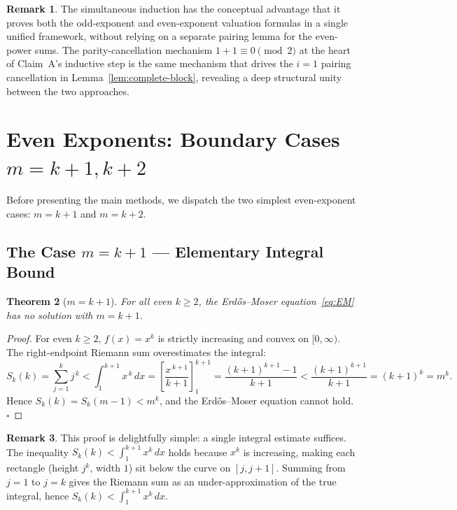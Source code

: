 \documentclass[12pt,a4paper]{article}
\theoremstyle{plain}
\newtheorem{theorem}{Theorem}[section]
\theoremstyle{definition}
\newtheorem{remark}[theorem]{Remark}
\begin{document}
\begin{remark}
  The simultaneous induction has the conceptual advantage that it proves
  both the odd-exponent and even-exponent valuation formulas in a single
  unified framework, without relying on a separate pairing lemma for the
  even-power sums.  The parity-cancellation mechanism
  $1 + 1 \equiv 0 \pmod{2}$ at the heart of Claim~A's inductive step is
  the same mechanism that drives the $i=1$ pairing cancellation in
  Lemma~\ref{lem:complete-block}, revealing a deep structural unity
  between the two approaches.
\end{remark}

\section{Even Exponents: Boundary Cases $m = k+1, k+2$}
\label{sec:boundary}

Before presenting the main methods, we dispatch the two simplest
even-exponent cases: $m = k+1$ and $m = k+2$.

\subsection{The Case $m = k+1$ --- Elementary Integral Bound}
\label{sec:even-k1}

\begin{theorem}[$m = k+1$]\label{thm:even-k1}
  For all even $k \ge 2$, the Erd\H{o}s--Moser equation~\eqref{eq:EM} has no
  solution with $m = k+1$.
\end{theorem}

\begin{proof}
  For even $k \ge 2$, $f(x) = x^k$ is strictly increasing and convex on
  $[0, \infty)$.  The right-endpoint Riemann sum overestimates the integral:
  \[
    S_k(k) = \sum_{j=1}^{k} j^{\,k}
    < \int_{1}^{k+1} x^{\,k}\,dx
    = \left[\frac{x^{\,k+1}}{k+1}\right]_{1}^{k+1}
    = \frac{(k+1)^{k+1} - 1}{k+1}
    < \frac{(k+1)^{k+1}}{k+1}
    = (k+1)^k = m^k.
  \]
  Hence $S_k(k) = S_k(m-1) < m^k$, and the Erd\H{o}s--Moser equation cannot
  hold.  \hfill$\square$
\end{proof}

\begin{remark}
  This proof is delightfully simple: a single integral estimate suffices.
  The inequality $S_k(k) < \int_{1}^{k+1} x^k\,dx$ holds because $x^k$ is
  increasing, making each rectangle (height $j^k$, width $1$) sit below the
  curve on $[j, j+1]$.  Summing from $j=1$ to $j=k$ gives the Riemann sum
  as an under-approximation of the true integral, hence $S_k(k) <
  \int_1^{k+1} x^k\,dx$.
\end{remark}
\end{document}
